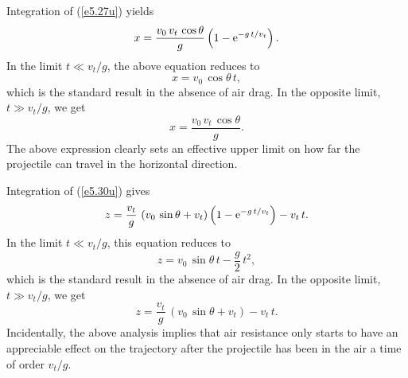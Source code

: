 Integration of (\ref{e5.27u}) yields
\begin{equation}
x = \frac{v_0\,v_t\,\cos\theta}{g}\left(1-{\rm e}^{-g\,t/v_t}\right).
\end{equation}
In the limit $t\ll v_t/g$, the above equation reduces to
\begin{equation}\label{e5.32u}
x = v_0\,\cos\theta\,t,
\end{equation}
which is the standard result in the absence of air drag.
In the opposite limit, $t\gg v_t/g$, we get
\begin{equation}\label{e5.33u}
x = \frac{v_0\,v_t\,\cos\theta}{g}.
\end{equation}
The above expression clearly sets an effective upper limit on how far the
projectile can travel in the horizontal direction.

Integration of (\ref{e5.30u}) gives
\begin{equation}
z = \frac{v_t}{g}\,\left(v_0\,\sin\theta + v_t\right)\left(1-{\rm e}^{-g\,t/v_t}\right) - v_t\,t.
\end{equation}
In the limit $t\ll v_t/g$, this equation reduces to
\begin{equation}
z = v_0\,\sin\theta\,t - \frac{g}{2}\,t^2,
\end{equation}
which is the standard result in the absence of air drag. In the opposite
limit, $t\gg v_t/g$, we get
\begin{equation}
z =  \frac{v_t}{g}\,\left(v_0\,\sin\theta + v_t\right) - v_t\,t.
\end{equation}
Incidentally,   the above analysis implies that air resistance
only starts to have an appreciable effect on the trajectory after
the projectile has been in the air a time of order $v_t/g$.

